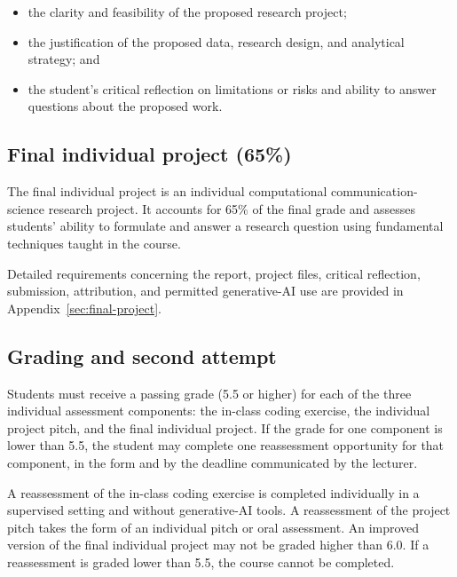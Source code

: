 \begin{itemize}
    \item the clarity and feasibility of the proposed research project;
    \item the justification of the proposed data, research design, and analytical strategy; and
    \item the student's critical reflection on limitations or risks and ability to answer questions about the proposed work.
\end{itemize}

\subsection*{Final individual project (65\%)}

The final individual project is an individual computational communication-science research project. It accounts for 65\% of the final grade and assesses students' ability to formulate and answer a research question using fundamental techniques taught in the course.

Detailed requirements concerning the report, project files, critical reflection, submission, attribution, and permitted generative-AI use are provided in Appendix~\ref{sec:final-project}.

\subsection*{Grading and second attempt}

Students must receive a passing grade (5.5 or higher) for each of the three individual assessment components: the in-class coding exercise, the individual project pitch, and the final individual project. If the grade for one component is lower than 5.5, the student may complete one reassessment opportunity for that component, in the form and by the deadline communicated by the lecturer.

A reassessment of the in-class coding exercise is completed individually in a supervised setting and without generative-AI tools. A reassessment of the project pitch takes the form of an individual pitch or oral assessment. An improved version of the final individual project may not be graded higher than 6.0. If a reassessment is graded lower than 5.5, the course cannot be completed.
